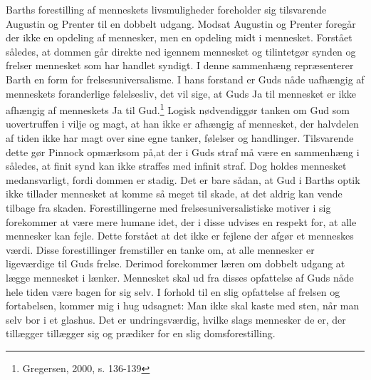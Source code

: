 Barths forestilling af menneskets livsmuligheder foreholder sig tilsvarende Augustin og Prenter til en dobbelt udgang. Modsat Augustin og Prenter foregår der ikke en opdeling af mennesker, men en opdeling midt i mennesket. Forstået således, at dommen går direkte ned igennem mennesket og tilintetgør synden og frelser mennesket som har handlet syndigt. I denne sammenhæng repræsenterer Barth en form for frelsesuniversalisme. I hans forstand er Guds nåde uafhængig af menneskets foranderlige følelsesliv, det vil sige, at Guds Ja til mennesket er ikke afhængig af menneskets Ja til Gud.\footnote {Gregersen, 2000, s. 136-139} Logisk nødvendiggør tanken om Gud som uovertruffen i vilje og magt, at han ikke er afhængig af mennesket, der halvdelen af tiden ikke har magt over sine egne tanker, følelser og handlinger. Tilsvarende dette gør Pinnock opmærksom på,at der i Guds straf må være en sammenhæng i således, at finit synd kan ikke straffes med infinit straf. Dog holdes mennesket medansvarligt, fordi dommen er stadig. Det er bare sådan, at Gud i Barths optik ikke tillader mennesket at komme så meget til skade, at det aldrig kan vende tilbage fra skaden. 
Forestillingerne med frelsesuniversalistiske motiver i sig forekommer at være mere humane idet, der i disse udvises en respekt for, at alle mennesker kan fejle. Dette forstået at det ikke er fejlene der afgør et menneskes værdi. Disse forestillinger fremstiller en tanke om, at alle mennesker er ligeværdige til Guds frelse. Derimod forekommer læren om dobbelt udgang at lægge mennesket i lænker. Mennesket skal ud fra disses opfattelse af Guds nåde hele tiden være bagen for sig selv. I forhold til en slig opfattelse af frelsen og fortabelsen, kommer mig i hug udsagnet: Man ikke skal kaste med sten, når man selv bor i et glashus. Det er undringsværdig, hvilke slags mennesker de er, der tillægger tillægger sig og prædiker for en slig domsforestilling.
